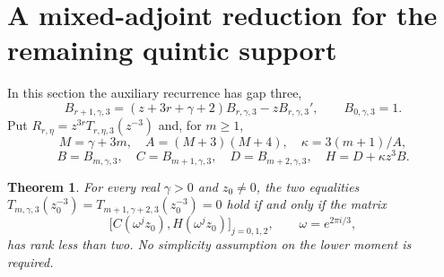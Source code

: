 \documentclass[11pt]{article}
\newtheorem{theorem}{Theorem}
\begin{document}
\section{A mixed-adjoint reduction for the remaining quintic support}
In this section the auxiliary recurrence has gap three,
\[
 B_{r+1,\gamma,3}=(z+3r+\gamma+2)B_{r,\gamma,3}
 -zB_{r,\gamma,3}',\qquad B_{0,\gamma,3}=1.
\]
Put $R_{r,\eta}=z^{3r}T_{r,\eta,3}(z^{-3})$ and, for $m\ge1$,
\[
 M=\gamma+3m,\quad A=(M+3)(M+4),\quad \kappa=3(m+1)/A,
\]
\[
 B=B_{m,\gamma,3},\quad C=B_{m+1,\gamma,3},\quad
 D=B_{m+2,\gamma,3},\quad H=D+\kappa z^3B.
\]
\begin{theorem}\label{thm:gap-three-offset-two-rank}
For every real $\gamma>0$ and $z_0\ne0$, the two equalities
$T_{m,\gamma,3}(z_0^{-3})=T_{m+1,\gamma+2,3}(z_0^{-3})=0$
hold if and only if the matrix
\[
 \bigl[C(\omega^jz_0),H(\omega^jz_0)\bigr]_{j=0,1,2},
       \qquad\omega=e^{2\pi i/3},                         \tag{Q1}\label{eq:mixed-quintic-rank}
\]
has rank less than two. No simplicity assumption on the lower
moment is required.
\end{theorem}
\end{document}
